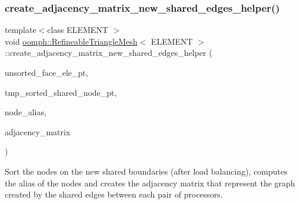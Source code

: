 \mbox{\label{classoomph_1_1RefineableTriangleMesh_a9a7862f1bcea07095590070bbc0305a7}} 
\subsubsection{\texorpdfstring{create\+\_\+adjacency\+\_\+matrix\+\_\+new\+\_\+shared\+\_\+edges\+\_\+helper()}{create\_adjacency\_matrix\_new\_shared\_edges\_helper()}}
{\footnotesize\ttfamily template$<$class E\+L\+E\+M\+E\+NT $>$ \\
void \hyperlink{classoomph_1_1RefineableTriangleMesh}{oomph\+::\+Refineable\+Triangle\+Mesh}$<$ E\+L\+E\+M\+E\+NT $>$\+::create\+\_\+adjacency\+\_\+matrix\+\_\+new\+\_\+shared\+\_\+edges\+\_\+helper (\begin{DoxyParamCaption}\item[{\hyperlink{classoomph_1_1Vector}{Vector}$<$ \hyperlink{classoomph_1_1Vector}{Vector}$<$ \hyperlink{classoomph_1_1FiniteElement}{Finite\+Element} $\ast$$>$ $>$ \&}]{unsorted\+\_\+face\+\_\+ele\+\_\+pt,  }\item[{\hyperlink{classoomph_1_1Vector}{Vector}$<$ \hyperlink{classoomph_1_1Vector}{Vector}$<$ \hyperlink{classoomph_1_1Node}{Node} $\ast$$>$ $>$ \&}]{tmp\+\_\+sorted\+\_\+shared\+\_\+node\+\_\+pt,  }\item[{std\+::map$<$ \hyperlink{classoomph_1_1Node}{Node} $\ast$, \hyperlink{classoomph_1_1Vector}{Vector}$<$ \hyperlink{classoomph_1_1Vector}{Vector}$<$ unsigned $>$ $>$ $>$ \&}]{node\+\_\+alias,  }\item[{\hyperlink{classoomph_1_1Vector}{Vector}$<$ \hyperlink{classoomph_1_1Vector}{Vector}$<$ \hyperlink{classoomph_1_1Vector}{Vector}$<$ unsigned $>$ $>$ $>$ \&}]{adjacency\+\_\+matrix }\end{DoxyParamCaption})}



Sort the nodes on the new shared boundaries (after load balancing), computes the alias of the nodes and creates the adjacency matrix that represent the graph created by the shared edges between each pair of processors. 



